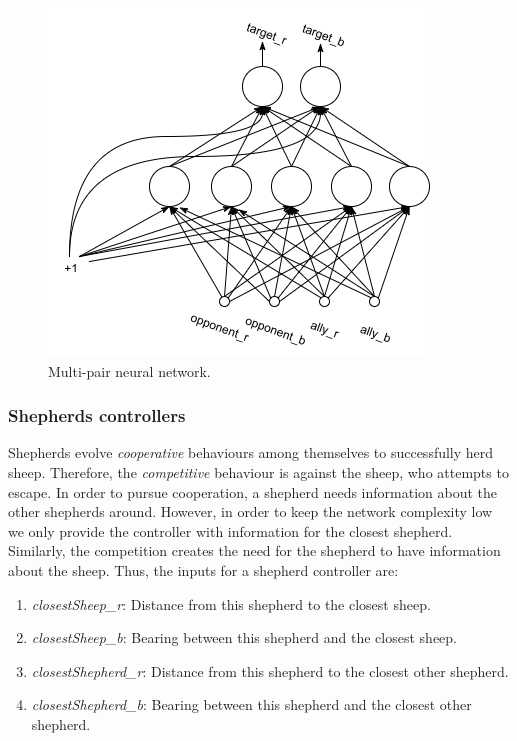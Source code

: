 \documentclass[conference]{IEEEtran}
\begin{document}
\begin{figure}[t]
	\centering
	\includegraphics[width=0.8\hsize]{imgs/nn-design_multi.png}
	\caption{Multi-pair neural network.}
	\label{fig:multi_pair_topology}
\end{figure}

\vspace{0.5em}
\subsubsection{Shepherds controllers}
Shepherds evolve \textit{cooperative} behaviours among themselves to successfully herd sheep.
Therefore, the \textit{competitive} behaviour is against the sheep, who attempts to escape.
In order to pursue cooperation, a shepherd needs information about the other shepherds around. 
However, in order to keep the network complexity low we only provide the controller with information for the closest shepherd. 
Similarly, the competition creates the need for the shepherd to have information about the sheep.
Thus, the inputs for a shepherd controller are: 

\begin{enumerate}
	\item \textit{closestSheep\_r}: Distance from this shepherd to the closest sheep.
	\item \textit{closestSheep\_b}: Bearing between this shepherd and the closest sheep. 
	\item \textit{closestShepherd\_r}: Distance from this shepherd to the closest other shepherd.
	\item \textit{closestShepherd\_b}: Bearing between this shepherd and the closest other shepherd.
\end{enumerate}
\end{document}

